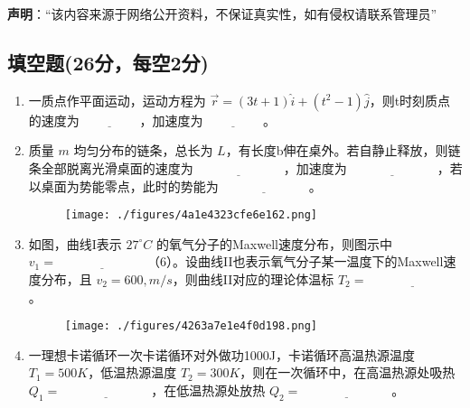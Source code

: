 
\textbf{声明}：“该内容来源于网络公开资料，不保证真实性，如有侵权请联系管理员”

\subsection{填空题(26分，每空2分)}
\begin{enumerate}
        \item 一质点作平面运动，运动方程为 $\vec{r} = (3t + 1) \hat{i} + (t^2 - 1) \hat{j}$，则t时刻质点的速度为$\underline{\hspace{2cm}}$，加速度为$\underline{\hspace{2cm}}$。
        
        \item 质量 $m$ 均匀分布的链条，总长为 $L$，有长度b伸在桌外。若自静止释放，则链条全部脱离光滑桌面的速度为$\underline{\hspace{3cm}}$，加速度为$\underline{\hspace{3cm}}$，若以桌面为势能零点，此时的势能为$\underline{\hspace{3cm}}$。
        \begin{figure}[ht]
        \centering
        \texttt{[image: ./figures/4a1e4323cfe6e162.png]}
        \caption{} \label{fig_NIU06_1}
        \end{figure}

        \item 如图，曲线I表示 $27^\circ C$ 的氧气分子的Maxwell速度分布，则图示中 $v_1 = \underline{\hspace{3cm}}$（6）。设曲线II也表示氧气分子某一温度下的Maxwell速度分布，且 $v_2 = 600 , m/s$，则曲线II对应的理论体温标 $T_2 = \underline{\hspace{3cm}}$。
        \begin{figure}[ht]
        \centering
        \texttt{[image: ./figures/4263a7e1e4f0d198.png]}
        \caption{} \label{fig_NIU06_2}
        \end{figure}

        \item 一理想卡诺循环一次卡诺循环对外做功1000J，卡诺循环高温热源温度 $T_1 = 500K$，低温热源温度 $T_2 = 300K$，则在一次循环中，在高温热源处吸热 $Q_1 = \underline{\hspace{3cm}}$，在低温热源处放热 $Q_2 = \underline{\hspace{3cm}}$。
        

\end{enumerate}
